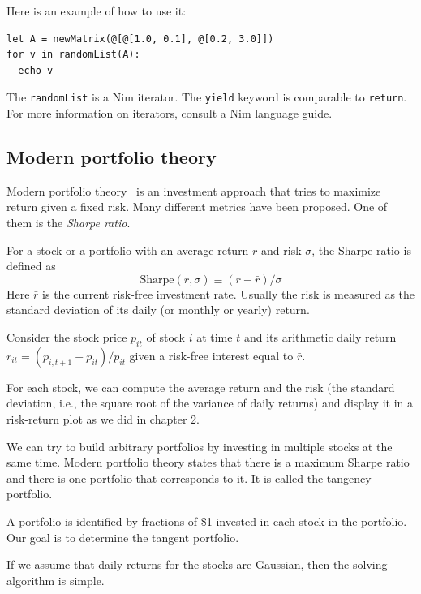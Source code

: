 \documentclass[justified, sixbynine]{tufte-book}
\def\ft{\small\tt}
\theoremstyle{plain}%
\newtheorem * {corollary}{Corollary}
\theoremstyle{definition}
\theoremstyle{remark}
\newtheorem * {remark}{Remark}
\newtheorem * {note}{Note}
\begin{document}
\begin{fullwidth}
Here is an example of how to use it:

\begin{lstlisting}
let A = newMatrix(@[@[1.0, 0.1], @[0.2, 3.0]])
for v in randomList(A):
  echo v
\end{lstlisting}

The {\ft randomList} is a Nim iterator. The {\ft yield} keyword is comparable to {\ft return}. For more information on iterators, consult a Nim language guide.

\goodbreak\subsection{Modern portfolio theory}


Modern portfolio theory~\cite{mpt} is an investment approach that tries to maximize return given a fixed risk. Many different metrics have been proposed. One of them is the {\it Sharpe ratio}.

For a stock or a portfolio with an average return $r$ and risk $\sigma$, the Sharpe ratio is defined as
\begin{equation}
\textrm{Sharpe}(r, \sigma) \equiv (r-\bar r)/\sigma
\end{equation}
Here $\bar r$ is the current risk-free investment rate. Usually the risk is measured as the standard deviation of its daily (or monthly or yearly) return.

Consider the stock price $p_{it}$ of stock $i$ at time $t$ and its arithmetic daily return
$r_{it}=(p_{i, t+1}-p_{it})/p_{it}$ given a risk-free interest equal to $\bar r$.

For each stock, we can compute the average return and the risk (the standard deviation, i.e., the square root of the variance of daily returns) and display it in a risk-return plot as we did in chapter 2.

We can try to build arbitrary portfolios by investing in multiple stocks at the same time. Modern portfolio theory states that there is a maximum Sharpe ratio and there is one portfolio that corresponds to it. It is called the tangency portfolio.

A portfolio is identified by fractions of \$1 invested in each stock in the portfolio. Our goal is to determine the tangent portfolio.

If we assume that daily returns for the stocks are Gaussian, then the solving algorithm is simple.


\end{fullwidth}
\end{document}
